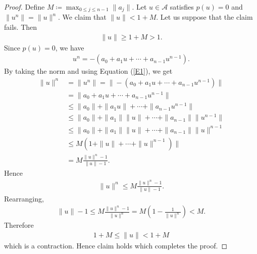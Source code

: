 \documentclass[10pt,a4paper]{amsart}
\begin{document}
\begin{proof}
	Define $M\coloneqq \max_{0\leq j \leq n-1}\|a_j\|.$ Let $u \in \mathcal{A}$ satisfies $p(u)=0$ and $\|u^n\|=\|u\|^n$. We claim that $	\|u\|< 1+M$. Let us suppose that the claim fails. Then 
	\begin{align*}
		   	\|u\|\geq 1+M>1.
	\end{align*}
Since $p(u)=0$, we have 
\begin{align*}
	u^n=-(a_0+a_1u+\cdots+a_{n-1}u^{n-1}).
\end{align*}
By taking the norm and using Equation (\ref{E1}), we get 
\begin{align*}
\|u\|^n&=\|u^n\|=\|-(a_0+a_1u+\cdots+a_{n-1}u^{n-1})\|\\
&=\|a_0+a_1u+\cdots+a_{n-1}u^{n-1}\|\\
&\leq \|a_0\|+\|a_1u\|+\cdots+\|a_{n-1}u^{n-1}\|\\
&\leq \|a_0\|+\|a_1\|\|u\|+\cdots+\|a_{n-1}\|\|u^{n-1}\|\\
&\leq \|a_0\|+\|a_1\|\|u\|+\cdots+\|a_{n-1}\|\|u\|^{n-1}\\
&\leq M(1+\|u\|+\cdots+\|u\|^{n-1})\|\\
&=M\frac{\|u\|^n-1}{\|u\|-1}.
\end{align*}
Hence 
\begin{align*}
\|u\|^n\leq M\frac{\|u\|^n-1}{\|u\|-1}. 
\end{align*}
Rearranging, 
\begin{align*}
	\|u\|-1\leq M\frac{\|u\|^n-1}{\|u\|^n}=M \left(1-\frac{1}{\|u\|^n}\right)<M.
\end{align*}
Therefore 
\begin{align*}
	1+M\leq \|u\|<1+M
\end{align*}
which is a contraction. Hence claim holds which completes the proof. 
\end{proof}
\end{document}
